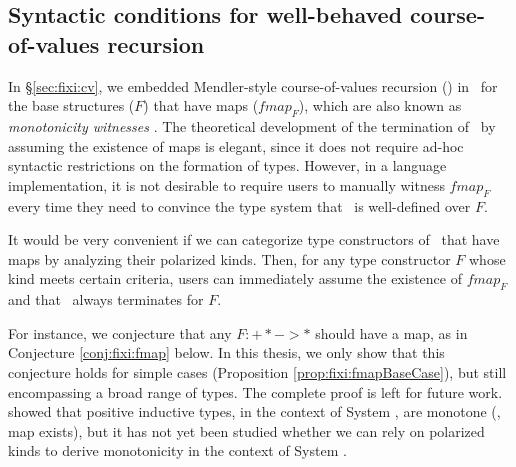 \subsection{Syntactic conditions for well-behaved course-of-values recursion}
\label{ssec:fixi:theory:cv}
In \S\ref{sec:fixi:cv}, we embedded Mendler-style course-of-values
recursion (\McvPr) in \Fixi\ for the base structures ($F$)
that have maps ($\textit{fmap}_F$), which are also known as
\emph{monotonicity witnesses} \cite{Mat98,Mat99}. The theoretical development of
the termination of \McvPr\ by assuming the existence of maps is elegant, since
it does not require ad-hoc syntactic restrictions on the formation of types.
However, in a language implementation, it is not desirable to require users to
manually witness $\textit{fmap}_F$ every time they need to convince
the type system that \McvPr\ is well-defined over $F$.

It would be very convenient if we can categorize type constructors of \Fixi\ that
have maps by analyzing their polarized kinds. Then, for any type constructor $F$
whose kind meets certain criteria, users can immediately assume the existence
of $\textit{fmap}_F$ and that \McvPr\ always terminates for $F$.

For instance, we conjecture that any $F: +* -> *$ should have a map, as in
Conjecture \ref{conj:fixi:fmap} below. In this thesis, we only show that this
conjecture holds for simple cases (Proposition \ref{prop:fixi:fmapBaseCase}),
but still encompassing a broad range of types.
The complete proof is left for future work.
\citet{Mat99} showed that positive inductive types, in the context of System \F,
are monotone (\ie, map exists), but it has not yet been studied
whether we can rely on polarized kinds to derive monotonicity
in the context of System \Fw.


